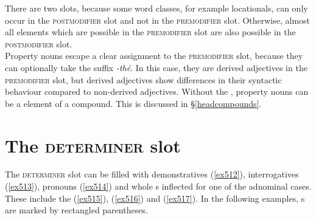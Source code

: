 There are two  slots, because some word classes, for example locationals, can only occur in the \textsc{postmodifier} slot and not in the \textsc{premodifier} slot. Otherwise, almost all elements which are possible in the \textsc{premodifier} slot are also possible in the \textsc{postmodifier} slot.\\

Property nouns escape a clear assignment to the \textsc{premodifier} slot, because they can optionally take the  suffix \emph{-thé}. In this case, they are derived adjectives in the \textsc{premodifier} slot, but derived adjectives show differences in their syntactic behaviour compared to non-derived adjectives. Without the , property nouns can be a  element of a  compound. This is discussed in \S{}\ref{headcompounds}.

\section{The \textsc{determiner} slot}\label{npsyntaxdeterminer}

The \textsc{determiner} slot can be filled with demonstratives (\ref{ex512}), interrogatives (\ref{ex513}),  pronouns (\ref{ex514}) and whole s inflected for one of the adnominal cases. These include the  (\ref{ex515}),   (\ref{ex516}) and   (\ref{ex517}). In the following examples, s are marked by rectangled parentheses.

